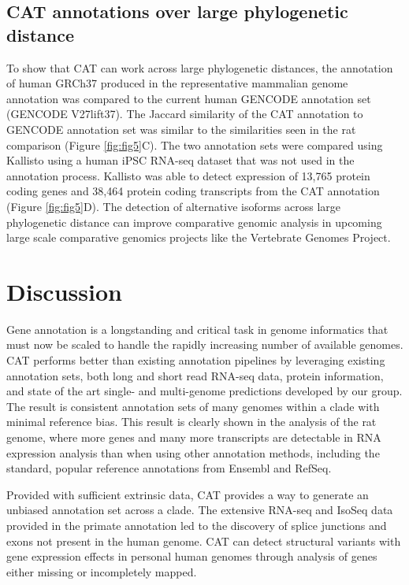 \documentclass[fleqn,10pt]{wlscirep}
\begin{document}
\subsection*{CAT annotations over large phylogenetic distance}

To show that CAT can work across large phylogenetic distances, the annotation of human GRCh37 produced in the representative mammalian genome annotation was compared to the current human GENCODE annotation set (GENCODE V27lift37). The Jaccard similarity of the CAT annotation to GENCODE annotation set was similar to the similarities seen in the rat comparison (Figure \ref{fig:fig5}C). The two annotation sets were compared using Kallisto using a human iPSC RNA-seq dataset that was not used in the annotation process. Kallisto was able to detect expression of 13,765 protein coding genes and 38,464 protein coding transcripts from the CAT annotation (Figure \ref{fig:fig5}D). The detection of alternative isoforms across large phylogenetic distance can improve comparative genomic analysis in upcoming large scale comparative genomics projects like the Vertebrate Genomes Project.

\section*{Discussion}
Gene annotation is a longstanding and critical task in genome informatics that must now be scaled to handle the rapidly increasing number of available genomes. CAT performs better than existing annotation pipelines by leveraging existing annotation sets, both long and short read RNA-seq data, protein information, and state of the art single- and multi-genome predictions developed by our group. The result is consistent annotation sets of many genomes within a clade with minimal reference bias. This result is clearly shown in the analysis of the rat genome, where more genes and many more transcripts are detectable in RNA expression analysis than when using other annotation methods, including the standard, popular reference annotations from Ensembl and RefSeq.

Provided with sufficient extrinsic data, CAT provides a way to generate an unbiased annotation set across a clade. The extensive RNA-seq and IsoSeq data provided in the primate annotation led to the discovery of splice junctions and exons not present in the human genome. CAT can detect structural variants with gene expression effects in personal human genomes through analysis of genes either missing or incompletely mapped.
\end{document}
